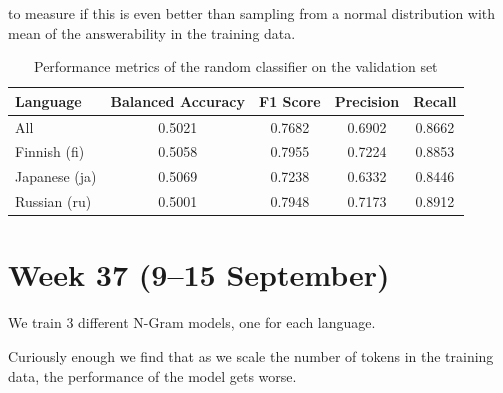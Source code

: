 \documentclass[11pt]{article}
\begin{document}
\begin{enumerate}
    to measure if this is even better than sampling from a normal distribution with mean of the answerability in the training data. 
    \begin{table}[ht]
        \centering
        \begin{tabular}{|l|c|c|c|c|}
            \hline
            Language & Balanced Accuracy & F1 Score & Precision & Recall \\
            \hline
            All & 0.5021 & 0.7682 & 0.6902 & 0.8662 \\
            Finnish (fi) & 0.5058 & 0.7955 & 0.7224 & 0.8853 \\
            Japanese (ja) & 0.5069 & 0.7238 & 0.6332 & 0.8446 \\
            Russian (ru) & 0.5001 & 0.7948 & 0.7173 & 0.8912 \\
            \hline
        \end{tabular}
        \caption{Performance metrics of the random classifier on the validation set}
        \label{tab:random_classifier_performance}
    \end{table}

\end{enumerate}

\section{Week 37 (9--15 September)}

We train 3 different N-Gram models, one for each language.

Curiously enough we find that as we scale the number of tokens in the training data, the performance of the model gets worse.
\end{document}
